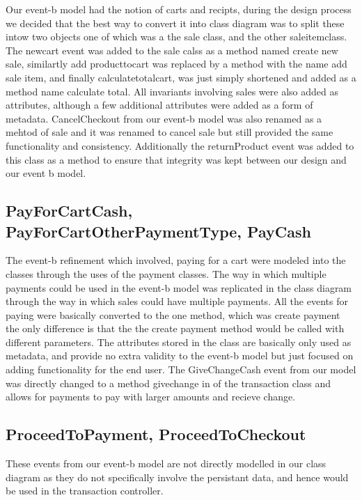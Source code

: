\documentclass[a4paper]{article}
\begin{document}
Our event-b model had the notion of carts and recipts, during the design process we decided that the best way to convert it into class diagram was to split these intow two objects one of which was a the sale class, and the other saleitemclass. The newcart event was added to the sale  calss as a method named create new sale, similartly add producttocart was replaced by a method with the name add sale item, and finally calculatetotalcart, was just simply shortened and added as a method name calculate total. All invariants involving sales were also added as attributes, although a few additional attributes were added as a form of metadata. CancelCheckout from our event-b model was also renamed as a mehtod of sale and it was renamed to cancel sale but still provided the same functionality and consistency. Additionally the returnProduct  event was added to this class as a method to ensure that integrity was kept between our design and our event b model.

\subsection{PayForCartCash, PayForCartOtherPaymentType, PayCash}

The event-b refinement which involved, paying for a cart were modeled into the  classes through the uses of the payment classes. The way in which multiple payments could be used in the event-b model was replicated in the class diagram through the way in which sales could have multiple payments. All the events for paying were basically converted to the one method, which was create payment the only difference is that the the create payment method would be called with different parameters. The attributes stored in the class are basically only used as metadata, and provide no extra validity to the event-b model but just focused on adding functionality for the end user. The GiveChangeCash event from our model was directly changed to a method givechange in of the transaction class and allows for payments to pay with larger amounts and recieve change.

\subsection{ProceedToPayment, ProceedToCheckout}

These events from our event-b model are not directly modelled in our class diagram as they do not specifically involve the persistant data, and hence would be used in the transaction controller. 
\end{document}
